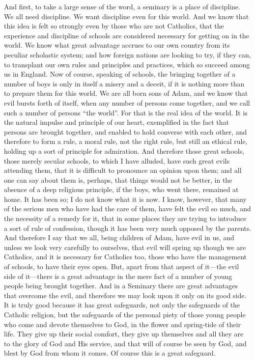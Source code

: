 And first, to take a large sense of the word, a seminary is a place
of discipline. We all need discipline. We want discipline even for
this world. And we know that this idea is felt so strongly even by
those who are not Catholics, that the experience and discipline of
schools are considered necessary for getting on in the world. We know
what great advantage accrues to our own country from its peculiar
scholastic system; and how foreign nations are looking to try, if they
can, to transplant our own rules and principles and practices, which
so succeed among us in England. Now of course, speaking of
schools, the bringing together of a number of boys is only in itself a
misery and a deceit, if it is nothing more than to prepare them for
this world. We are all born sons of Adam, and we know that evil bursts
forth of itself, when any number of persons come together, and we call
such a number of persons ``the world''. For that is the real
idea of the world. It is the natural impulse and principle of our
heart, exemplified in the fact that persons are brought together, and
enabled to hold converse with each other, and therefore to form a
rule, a moral rule, not the right rule, but still an ethical rule,
holding up a sort of principle for admiration. And therefore those
great schools, those merely secular schools, to which I have alluded,
have such great evils attending them, that it is difficult to
pronounce an opinion upon them; and all one can say about them is,
perhaps, that things would not be better, in the absence of a deep
religious principle, if the boys, who went there, remained at home. It
has been so; I do not know what it is now. I know, however, that many
of the serious men who have had the care of them, have felt the evil
so much, and the necessity of a remedy for it, that in some places
they are trying to introduce a sort of rule of confession, though it
has been very much opposed by the parents. And therefore I say that we
all, being children of Adam, have evil in us, and unless we look very
carefully to ourselves, that evil will spring up though we are
Catholics, and it is necessary for Catholics too, those who have the
management of schools, to have their eyes open. But, apart from that
aspect of it—the evil side of it—there is a great advantage in the
mere fact of a number of young people being brought together. And in a
Seminary there are great advantages that overcome the evil, and
therefore we may look upon it only on its good side. It is truly good
because it has great safeguards, not only the safeguards of the
Catholic religion, but the safeguards of the personal piety of those
young people who come and devote themselves to God, in the flower and
spring-tide of their life. They give up their social comfort, they
give up themselves and all they are to the glory of God and His
service, and that will of course be seen by God, and blest by God from
whom it comes. Of course this is a great safeguard.

